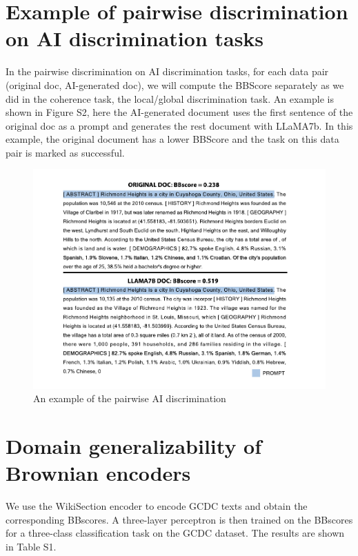 \documentclass[letterpaper]{article} %
\begin{document}
\section{Example of pairwise discrimination on AI discrimination tasks}
\label{pairai}
In the pairwise discrimination on AI discrimination tasks, for each data pair (original doc, AI-generated doc), we will compute the BBScore separately as we did in the coherence task, the local/global discrimination task. An example is shown in Figure S2, here the AI-generated document uses the first sentence of the original doc as a prompt and generates the rest document with LLaMA7b. In this example, the original document has a lower BBScore and the task on this data pair is marked as successful.
\begin{figure}[htbp]
\centering
\includegraphics[width=1.15\linewidth,trim={1.1cm 0cm 0cm 0cm},clip]{pictures/AItext.pdf}
\caption{An example of the pairwise AI discrimination}
\label{fig:ai_example}
\end{figure}

\section{Domain generalizability of Brownian encoders}
\label{app:gcdc}
We use the WikiSection encoder to encode GCDC texts and obtain the corresponding BBscores. A three-layer perceptron is then trained on the BBscores for a three-class classification task on the GCDC dataset. The results are shown in Table S1.
\end{document}
